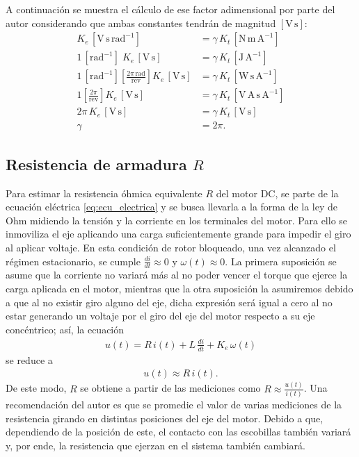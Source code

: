         A continuación se muestra el cálculo de ese factor adimensional por parte del autor \cite{EcCaracterizacionMotor} considerando que ambas constantes tendrán de magnitud $[\mathrm{V\,s}]$:
            \begin{align*}
                K_e\,[\mathrm{V\,s\,rad^{-1}}] &= \gamma\,K_t\,[\mathrm{N\,m\,A^{-1}}] \\
                1\,[\mathrm{rad^{-1}}]\;K_e\,[\mathrm{V\,s}] &= \gamma\,K_t\,[\mathrm{J\,A^{-1}}] \\
                1\,[\mathrm{rad^{-1}}]\!\left[\frac{2\pi\,\mathrm{rad}}{\mathrm{rev}}\right]\!K_e\,[\mathrm{V\,s}] &= \gamma\,K_t\,[\mathrm{W\,s\,A^{-1}}] \\
                1\!\left[\frac{2\pi}{\mathrm{rev}}\right]\!K_e\,[\mathrm{V\,s}] &= \gamma\,K_t\,[\mathrm{V\,A\,s\,A^{-1}}] \\
                2\pi\,K_e\,[\mathrm{V\,s}] &= \gamma\,K_t\,[\mathrm{V\,s}] \\
                \gamma &= 2\pi .
            \end{align*}
        
    \subsection{Resistencia de armadura $R$}
    \label{sec:resis}
        Para estimar la resistencia óhmica equivalente $R$ del motor \ac{DC}, se parte de la ecuación eléctrica \eqref{eq:ecu_electrica} y se busca llevarla a la forma de la ley de Ohm midiendo la tensión y la corriente en los terminales del motor. Para ello se inmoviliza el eje aplicando una carga suficientemente grande para impedir el giro al aplicar voltaje. En esta condición de rotor bloqueado, una vez alcanzado el régimen estacionario, se cumple \(\tfrac{di}{dt}\approx 0\) y \(\omega(t)\approx 0\). La primera suposición se asume que la corriente no variará más al no poder vencer el torque que ejerce la carga aplicada en el motor, mientras que la otra suposición la asumiremos debido a que al no existir giro alguno del eje, dicha expresión será igual a cero al no estar generando un voltaje por el giro del eje del motor respecto a su eje concéntrico; así, la ecuación
        \begin{align*}
        u(t) = R\,i(t) + L\,\frac{di}{dt} + K_e\,\omega(t)
        \end{align*} 
        se reduce a
        \begin{align}
        u(t) \approx R\,i(t).
        \end{align}
        De este modo, \(R\) se obtiene a partir de las mediciones como \(R \approx \tfrac{u(t)}{i(t)}\).
        Una recomendación del autor es que se promedie el valor de varias mediciones de la resistencia girando en distintas posiciones del eje del motor. Debido a que, dependiendo de la posición de este, el contacto con las escobillas también variará y, por ende, la resistencia que ejerzan en el sistema también cambiará.
            
